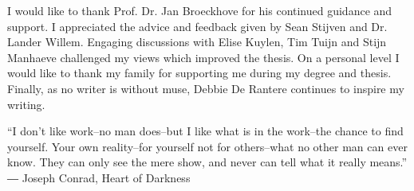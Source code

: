 I would like to thank Prof. Dr. Jan Broeckhove for his continued guidance and support. 
I appreciated the advice and feedback given by Sean Stijven and Dr. Lander Willem.
Engaging discussions with Elise Kuylen, Tim Tuijn and Stijn Manhaeve challenged my views which improved the thesis. 
On a personal level I would like to thank my family for supporting me during my degree and thesis. 
Finally, as no writer is without muse, Debbie De Rantere continues to inspire my writing. \\

%
\begin{displayquote}
“I don't like work--no man does--but I like what is in the work--the chance to find yourself. Your own reality--for yourself not for others--what no other man can ever know. They can only see the mere show, and never can tell what it really means.” \\
― Joseph Conrad, Heart of Darkness
\end{displayquote}

